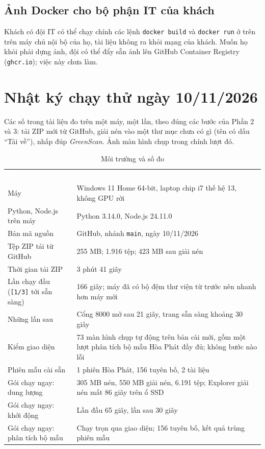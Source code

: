 \documentclass[12pt,a4paper,oneside]{report}
\newcommand{\thd}[1]{\textcolor{white}{\bfseries #1}}
\newcommand{\hdr}{\rowcolor{gsteal}}
\newcommand{\bangchu}{\small\linespread{1.1}\selectfont}
\begin{document}
\section{Ảnh Docker cho bộ phận IT của khách}
Khách có đội IT có thể chạy chính các lệnh \texttt{docker build} và \texttt{docker run} ở trên trên máy chủ nội bộ của họ, tài liệu không ra khỏi mạng của khách. Muốn họ khỏi phải dựng ảnh, đội có thể đẩy sẵn ảnh lên GitHub Container Registry (\texttt{ghcr.io}); việc này chưa làm.

\appendix
\chapter{Nhật ký chạy thử ngày 10/11/2026}
Các số trong tài liệu đo trên một máy, một lần, theo đúng các bước của Phần 2 và 3: tải ZIP mới từ GitHub, giải nén vào một thư mục chưa có gì (tên có dấu ``Tải về''), nhấp đúp \emph{GreenScan}. Ảnh màn hình chụp trong chính lượt đó.

\begin{table}[!htbp]\centering\bangchu
\caption{Môi trường và số đo}\label{tab:nhatky}
\begin{tabularx}{\linewidth}{L{6cm}Y}
\hdr \thd{Mục} & \thd{Giá trị} \\
Máy & Windows 11 Home 64-bit, laptop chip i7 thế hệ 13, không GPU rời \\
Python, Node.js trên máy & Python 3.14.0, Node.js 24.11.0 \\
Bản mã nguồn & GitHub, nhánh \texttt{main}, ngày 10/11/2026 \\
Tệp ZIP tải từ GitHub & 255 MB; 1.916 tệp; 423 MB sau giải nén \\
Thời gian tải ZIP & 3 phút 41 giây \\
Lần chạy đầu (\texttt{[1/3]} tới sẵn sàng) & 166 giây; máy đã có bộ đệm thư viện từ trước nên nhanh hơn máy mới \\
Những lần sau & Cổng 8000 mở sau 21 giây, trang sẵn sàng khoảng 30 giây \\
Kiểm giao diện & 73 màn hình chụp tự động trên bản cài mới, gồm một lượt phân tích bộ mẫu Hòa Phát đầy đủ; không bước nào lỗi \\
Phiên mẫu cài sẵn & 1 phiên Hòa Phát, 156 tuyên bố, 2 tài liệu \\
Gói chạy ngay: dung lượng & 305 MB nén, 550 MB giải nén, 6.191 tệp; Explorer giải nén mất 86 giây trên ổ SSD \\
Gói chạy ngay: khởi động & Lần đầu 65 giây, lần sau 30 giây \\
Gói chạy ngay: phân tích bộ mẫu & Chạy trọn qua giao diện; 156 tuyên bố, kết quả trùng phiên mẫu \\
\end{tabularx}
\end{table}
\end{document}
